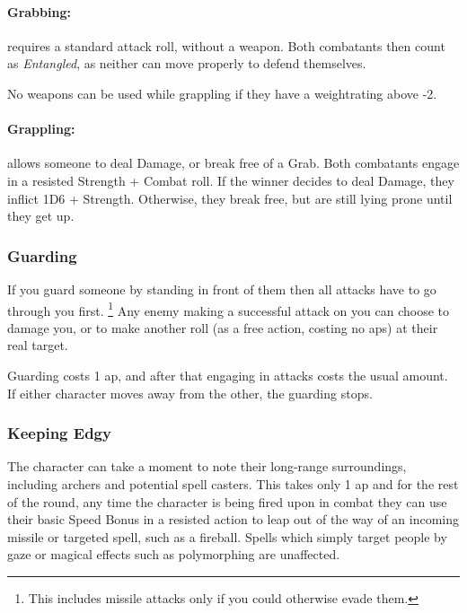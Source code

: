 \begin{multicols}{2}
\paragraph[Grabs: Make an attack without any weapon bonus. Both combatants are \textit{Entangled}. Cost: 1 \gls{ap}]{Grabbing:}
requires a standard attack roll, without a weapon.
Both combatants then count as \textit{Entangled}, as neither can move properly to defend themselves.

No weapons can be used while grappling if they have a \gls{weightrating} above -2.

\paragraph[Grapple: Make an opposted roll of Strength + Combat.  Success means the combatant can either break free or inflict Damage.  Cost: 3 \gls{ap}]{Grappling:}
allows someone to deal Damage, or break free of a Grab.
Both combatants engage in a resisted Strength + Combat roll.
If the winner decides to deal Damage, they inflict 1D6 + Strength.
Otherwise, they break free, but are still lying prone until they get up.

\subsubsection[Guard: Someone must successfully hit you before they are allowed to hit whomever you are guarding. Cost: 1 \gls{ap}]{Guarding}

If you guard someone by standing in front of them then all attacks have to go through you first.%
\footnote{This includes missile attacks only if you could otherwise evade them.}
Any enemy making a successful attack on you can choose to damage you, or to make another roll (as a free action, costing no \glspl{ap}) at their real target.

Guarding costs 1 \gls{ap}, and after that engaging in attacks costs the usual amount.
If either character moves away from the other, the guarding stops.

\subsubsection[Keep Edgy: Look out for missiles (allows you to defend against them with Speed Bonus). Cost: 1 \gls{ap}]{Keeping Edgy}
\label{edgy}

The character can take a moment to note their long-range surroundings, including archers and potential spell casters.
This takes only 1 \gls{ap} and for the rest of the round, any time the character is being fired upon in combat they can use their basic Speed Bonus in a resisted action to leap out of the way of an incoming missile or targeted spell, such as a fireball.
Spells which simply target people by gaze or magical effects such as polymorphing are unaffected.


\end{multicols}
